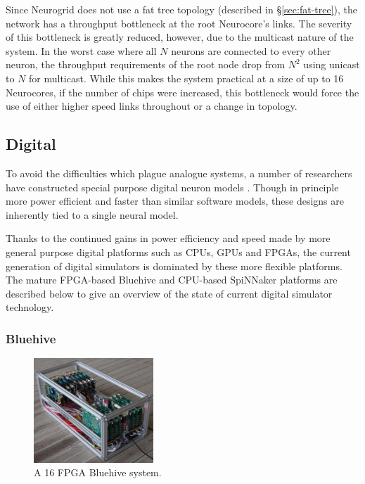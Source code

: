 				Since Neurogrid does not use a fat tree topology (described in
				\S\ref{sec:fat-tree}), the network has a throughput bottleneck at the
				root Neurocore's links. The severity of this bottleneck is greatly
				reduced, however, due to the multicast nature of the system. In the
				worst case where all $N$ neurons are connected to every other neuron,
				the throughput requirements of the root node drop from $N^2$ using
				unicast to $N$ for multicast. While this makes the system practical at a
				size of up to 16 Neurocores, if the number of chips were increased, this
				bottleneck would force the use of either higher speed links throughout
				or a change in topology.
			
			
		\subsection{Digital}
			
			
			To avoid the difficulties which plague analogue systems, a number of
			researchers have constructed special purpose digital neuron models
			\cite{prange93,jahnke96,schoenauer99,mehrtash03}. Though in principle more
			power efficient and faster than similar software models, these designs are
			inherently tied to a single neural model.
			
			Thanks to the continued gains in power efficiency and speed made by more
			general purpose digital platforms such as CPUs, GPUs and FPGAs, the
			current generation of digital simulators is dominated by these more
			flexible platforms. The mature FPGA-based Bluehive and CPU-based SpiNNaker
			platforms are described below to give an overview of the state of current
			digital simulator technology.
			
			\subsubsection{Bluehive}
				
				\begin{figure} \center
				\includegraphics[width=0.4\textwidth]{figures/bluehive}
					
					\caption{A 16 FPGA Bluehive system.} \label{fig:bluehive} \end{figure}
				
